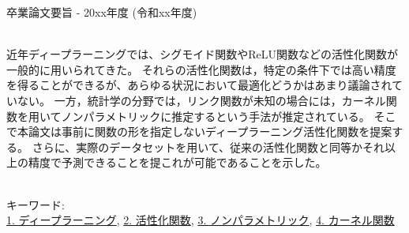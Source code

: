 卒業論文要旨 - 20xx年度 (令和xx年度)
\begin{center}
\begin{large}
\end{large}
\end{center}

~ \\



近年ディープラーニングでは、シグモイド関数やReLU関数などの活性化関数が一般的に用いられてきた。
それらの活性化関数は，特定の条件下では高い精度を得ることができるが、あらゆる状況において最適化どうかはあまり議論されていない。
一方，統計学の分野では，リンク関数が未知の場合には，カーネル関数を用いてノンパラメトリックに推定するという手法が推定されている。
そこで本論文は事前に関数の形を指定しないディープラーニング活性化関数を提案する。
さらに、実際のデータセットを用いて、従来の活性化関数と同等かそれ以上の精度で予測できることを提これが可能であることを示した。



~ \\
キーワード:\\
\underline{1. ディープラーニング},
\underline{2. 活性化関数},
\underline{3. ノンパラメトリック},
\underline{4. カーネル関数}
\begin{flushright}
\dept \\
\author
\end{flushright}
